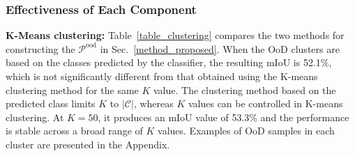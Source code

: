 \documentclass[10pt,twocolumn,letterpaper]{article}
\begin{document}
\subsubsection{Effectiveness of Each Component}
\vspace{-0.3em}



\textbf{K-Means clustering:} Table~\ref{table_clustering} compares the two methods for constructing the $\mathcal{P}^\text{ood}$ in Sec.~\ref{method_proposed}.
When the OoD clusters are based on the classes predicted by the classifier, the resulting mIoU is 52.1\%, which is not significantly different from that obtained using the K-means clustering method for the same $K$ value.
The clustering method based on the predicted class limits $K$ to $|\mathcal{C}|$, whereas $K$ values can be controlled in K-means clustering.
At $K=50$, it produces an mIoU value of 53.3\% and the performance is stable across a broad range of $K$ values. Examples of OoD samples in each cluster are presented in the Appendix.
\end{document}
